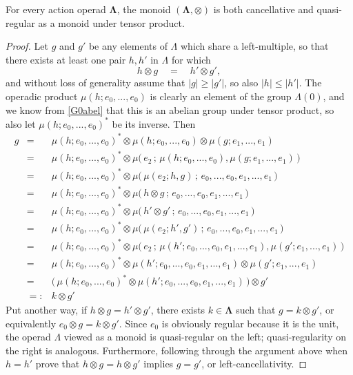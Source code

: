 \documentclass{amsbook} %
\newcommand{\ML}{\mathbf{\Lambda}}
\newcommand{\LL}{\Lambda}
\numberwithin{section}{chapter}
\begin{document}

\begin{prop} \label{cqr} For every action operad $\ML$, the monoid $(\ML, \otimes)$ is both cancellative and quasi-regular as a monoid under tensor product.
\end{prop}
\begin{proof}
Let $g$ and $g'$ be any elements of $\Lambda$ which share a left-multiple, so that there exists at least one pair $h, h'$ in $\Lambda$ for which
\[ h \otimes g \quad = \quad h' \otimes g', \]
and without loss of generality assume that $|g| \ge |g'|$, so also $|h| \le |h'|$. The operadic product $\mu(h; e_0, ..., e_0)$ is clearly an element of the group $\LL(0)$, and we know from \cref{G0abel} that this is an abelian group under tensor product, so also let $\mu(h; e_0, ..., e_0)^*$ be its inverse. Then
\[ \begin{array}{rll}
			g & = & \mu(h; e_0, ..., e_0)^* \otimes \mu(h; e_0, ..., e_0) \otimes \mu(g; e_1, ..., e_1) \\
			& = & \mu(h; e_0, ..., e_0)^* \otimes \mu\big( \, e_2 \, ; \, \mu(h; e_0, ..., e_0), \mu(g; e_1, ..., e_1) \, \big) \\
			& = & \mu(h; e_0, ..., e_0)^* \otimes \mu\big( \, \mu(e_2; h, g) \, ; \, e_0, ..., e_0, e_1, ..., e_1 \, \big) \\
			& = & \mu(h; e_0, ..., e_0)^* \otimes \mu\big( \, h \otimes g \, ; \, e_0, ..., e_0, e_1, ..., e_1 \, \big) \\
			& = & \mu(h; e_0, ..., e_0)^* \otimes \mu\big( \, h' \otimes g' \, ; \, e_0, ..., e_0, e_1, ..., e_1 \, \big) \\
			& = & \mu(h; e_0, ..., e_0)^* \otimes \mu\big( \, \mu(e_2; h', g') \, ; \, e_0, ..., e_0, e_1, ..., e_1 \, \big) \\
			& = & \mu(h; e_0, ..., e_0)^* \otimes \mu\big( \, e_2 \, ; \, \mu(h'; e_0, ..., e_0, e_1, ..., e_1), \mu(g'; e_1, ..., e_1) \, \big) \\
			& = & \mu(h; e_0, ..., e_0)^* \otimes \mu(h'; e_0, ..., e_0, e_1, ..., e_1) \otimes \mu(g'; e_1, ..., e_1) \\
			& = & \big( \, \mu(h; e_0, ..., e_0)^* \otimes \mu(h'; e_0, ..., e_0, e_1, ..., e_1) \, \big) \otimes g' \\
			& =: & k \otimes g'
		\end{array}
\]
Put another way, if $h \otimes g = h' \otimes g'$, there exists $k \in \ML$ such that $g = k \otimes g'$, or equivalently $e_0 \otimes g = k \otimes g'$. Since
 $e_0$ is obviously regular because it is the unit, the operad $\LL$ viewed as a monoid is quasi-regular on the left; quasi-regularity on the right is analogous. Furthermore, following through the argument above when $h = h'$ prove that $h \otimes g = h \otimes g'$ implies $g = g'$, or left-cancellativity.
\end{proof}
\end{document}
